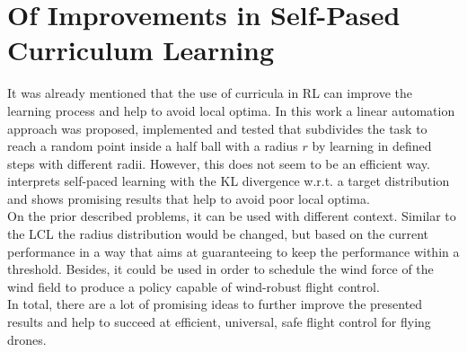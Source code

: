 \section{Of Improvements in Self-Pased Curriculum Learning}
It was already mentioned that the use of curricula in RL can improve the learning process and 
help to avoid local optima. In this work a linear automation approach was proposed, implemented 
and tested that subdivides the task to reach a random point inside a half ball with a radius $r$
by learning in defined steps with different radii. However, 
this does not seem to be an efficient way.
\cite{klink2021probabilistic} interprets self-paced learning with the KL divergence w.r.t. a
target distribution and shows promising results that help to avoid poor local optima.\\
On the prior described problems, it can be used with different context.
Similar to the LCL the radius distribution would be changed, but based on the current performance
in a way that aims at guaranteeing to keep the performance within a threshold.
Besides, it could be used in order to schedule the wind force of the wind field to 
produce a policy capable of wind-robust flight control.\\
\newline
In total, there are a lot of promising ideas to further improve the presented results
and help to succeed at efficient, universal, safe flight control for flying drones.



